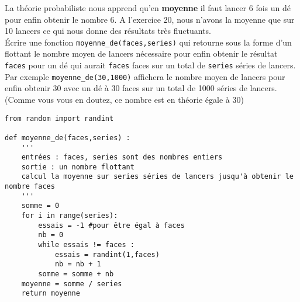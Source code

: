 \begin{cor}
\begin{multicols}{2}
La théorie probabiliste nous apprend qu'en \textbf{moyenne} il faut lancer 6 fois un dé pour enfin obtenir le nombre 6. A l'exercice 20, nous n'avons la moyenne que sur 10 lancers ce qui nous donne des résultats très fluctuants.\\
Écrire une fonction \texttt{moyenne\_de(faces,series)} qui retourne sous la forme d'un flottant le nombre moyen de lancers nécessaire pour enfin obtenir le résultat \texttt{faces} pour un dé qui aurait \texttt{faces} faces sur un total de \texttt{series} séries de lancers.\\
Par exemple \texttt{moyenne\_de(30,1000)}  affichera le nombre moyen de lancers pour enfin obtenir 30 avec un dé à 30 faces sur un total de 1000 séries de lancers.\\
(Comme vous vous en doutez, ce nombre est en théorie égale à 30)\\
\columnbreak
\begin{lstlisting}
from random import randint

def moyenne_de(faces,series) :
	'''
	entrées : faces, series sont des nombres entiers
	sortie : un nombre flottant
	calcul la moyenne sur series séries de lancers jusqu'à obtenir le nombre faces
	'''
	somme = 0
	for i in range(series):
		essais = -1 #pour être égal à faces
		nb = 0
		while essais != faces :
			essais = randint(1,faces)
			nb = nb + 1
		somme = somme + nb
	moyenne = somme / series
	return moyenne
\end{lstlisting}
\end{multicols}
\end{cor}

